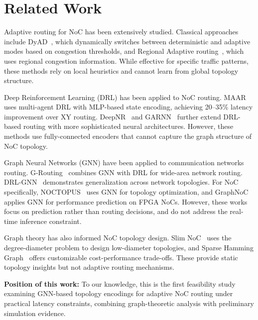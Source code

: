 \documentclass[conference]{IEEEtran}
\begin{document}
\section{Related Work}
\label{sec:related}

Adaptive routing for NoC has been extensively studied. Classical approaches include DyAD~\cite{dyad2004}, which dynamically switches between deterministic and adaptive modes based on congestion thresholds, and Regional Adaptive routing~\cite{ebrahimi2019}, which uses regional congestion information. While effective for specific traffic patterns, these methods rely on local heuristics and cannot learn from global topology structure.

Deep Reinforcement Learning (DRL) has been applied to NoC routing. MAAR~\cite{wang2022maar} uses multi-agent DRL with MLP-based state encoding, achieving 20--35\% latency improvement over XY routing. DeepNR~\cite{deepnr2022} and GARNN~\cite{garnn2023} further extend DRL-based routing with more sophisticated neural architectures. However, these methods use fully-connected encoders that cannot capture the graph structure of NoC topology.

Graph Neural Networks (GNN) have been applied to communication networks routing. G-Routing~\cite{g-routing2023} combines GNN with DRL for wide-area network routing. DRL-GNN~\cite{drl-gnn2019} demonstrates generalization across network topologies. For NoC specifically, NOCTOPUS~\cite{noctopus2026} uses GNN for topology optimization, and GraphNoC~\cite{graphnoc2024} applies GNN for performance prediction on FPGA NoCs. However, these works focus on prediction rather than routing decisions, and do not address the real-time inference constraint.

Graph theory has also informed NoC topology design. Slim NoC~\cite{slimnoc2018} uses the degree-diameter problem to design low-diameter topologies, and Sparse Hamming Graph~\cite{sparsehamming2023} offers customizable cost-performance trade-offs. These provide static topology insights but not adaptive routing mechanisms.

\textbf{Position of this work:} To our knowledge, this is the first feasibility study examining GNN-based topology encodings for adaptive NoC routing under practical latency constraints, combining graph-theoretic analysis with preliminary simulation evidence.
\end{document}
